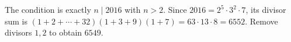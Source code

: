 The condition is exactly $n\mid2016$ with $n>2$. Since $2016=2^5\cdot3^2\cdot7$, its divisor sum is $(1+2+\cdots+32)(1+3+9)(1+7)=63\cdot13\cdot8=6552$. Remove divisors $1,2$ to obtain $\boxed{6549}$.
